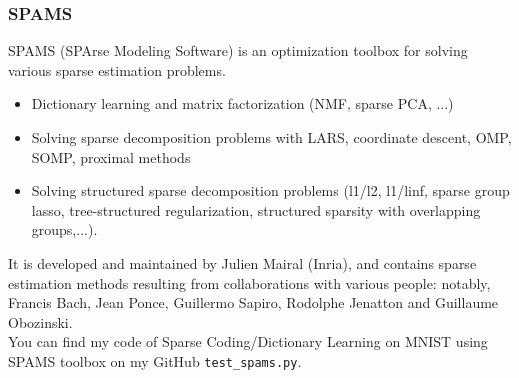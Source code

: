 \documentclass[a4paper,10pt]{article}
\begin{document}
\subsubsection{SPAMS}
SPAMS (SPArse Modeling Software) is an optimization toolbox for solving various sparse estimation problems.
\begin{itemize}
 \item Dictionary learning and matrix factorization (NMF, sparse PCA, ...)
 \item Solving sparse decomposition problems with LARS, coordinate descent, OMP, SOMP, proximal methods
 \item Solving structured sparse decomposition problems (l1/l2, l1/linf, sparse group lasso, tree-structured regularization, structured sparsity with overlapping groups,...).
\end{itemize}
It is developed and maintained by Julien Mairal (Inria), and contains sparse estimation methods resulting from collaborations with various people: notably, Francis Bach, Jean Ponce, Guillermo Sapiro, Rodolphe Jenatton and Guillaume Obozinski.\\
You can find my code of Sparse Coding/Dictionary Learning on MNIST using SPAMS toolbox on my GitHub \texttt{test\_spams.py}.\\
\newpage
\end{document}

